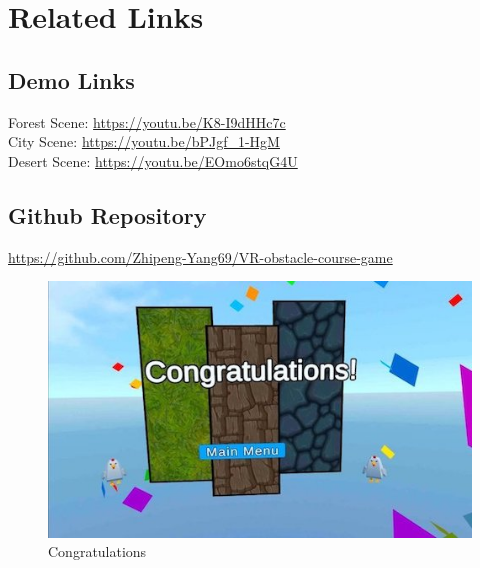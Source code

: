 \documentclass{vgtc}                          %
\begin{document}
\section{Related Links}
\subsection*{Demo Links}
Forest Scene: \url{https://youtu.be/K8-I9dHHc7c}\\
City Scene: \url{https://youtu.be/bPJgf_1-HgM}\\
Desert Scene: \url{https://youtu.be/EOmo6stqG4U}
\subsection*{Github Repository}
\url{https://github.com/Zhipeng-Yang69/VR-obstacle-course-game}

\begin{figure}[tb]
  \centering %
  \includegraphics[width=\columnwidth]{cong.jpeg}
  \caption{Congratulations}
 \end{figure}

%

%
%
%


\end{document}
